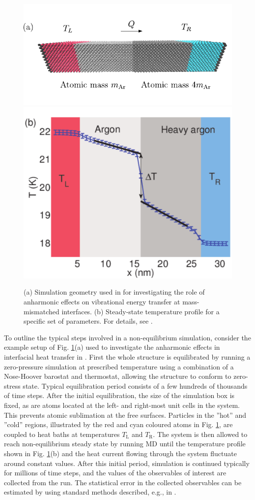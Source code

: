\begin{figure}[tb]
 \begin{center}
  \includegraphics[width=.59\columnwidth]{pics/nemd_fig2a_2.pdf} 
  \includegraphics[width=.59\columnwidth]{pics/nemd_fig2b_2.pdf}
  \caption{(a) Simulation geometry used in  for investigating the role of anharmonic effects on vibrational energy transfer at mass-mismatched interfaces. (b) Steady-state temperature profile for a specific set of parameters. For details, see .}  
\label{fig:th_spectral_geom}
 \end{center}
\end{figure}


To outline the typical steps involved in a non-equilibrium simulation, consider the example setup of Fig. \ref{fig:th_spectral_geom}(a) used to investigate the anharmonic effects in interfacial heat transfer in . First the whole structure is equilibrated by running a zero-pressure simulation at prescribed temperature using a combination of a Nose-Hoover barostat and thermostat, allowing the structure to conform to zero-stress state. Typical equilibration period consists of a few hundreds of thousands of time steps. After the initial equilibration, the size of the simulation box is fixed, as are atoms located at the left- and right-most unit cells in the system. This prevents atomic sublimation at the free surfaces. Particles in the ''hot'' and ''cold'' regions, illustrated by the red and cyan coloured atoms in Fig. \ref{fig:th_spectral_geom}, are coupled to heat baths at temperatures $T_{\textrm{L}}$ and $T_{\textrm{R}}$. The system is then allowed to reach non-equilibrium steady state by running MD until the temperature profile shown in Fig. \ref{fig:th_spectral_geom}(b) and the heat current flowing through the system fluctuate around constant values. After this initial period, simulation is continued typically for millions of time steps, and the values of the observables of interest are collected from the run. The statistical error in the collected observables can be estimated by using standard methods described, e.g., in .

